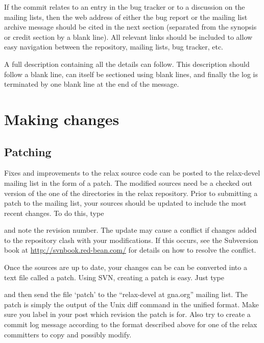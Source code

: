 If the commit relates to an entry in the bug tracker or to a discussion on the mailing lists, then the web address of either the bug report or the mailing list archive message should be cited in the next section (separated from the synopsis or credit section by a blank line).  All relevant links should be included to allow easy navigation between the repository, mailing lists, bug tracker, etc.

A full description containing all the details can follow.  This description should follow a blank line, can itself be sectioned using blank lines, and finally the log is terminated by one blank line at the end of the message.





\section{Making changes}


\subsection{Patching}

Fixes and improvements to the relax source code can be posted to the relax-devel mailing list in the form of a patch.  The modified sources need be a checked out version of the one of the directories in the relax repository.  Prior to submitting a patch to the mailing list, your sources should be updated to include the most recent changes.  To do this, type


and note the revision number.  The update may cause a conflict if changes added to the repository clash with your modifications.  If this occurs, see the Subversion book at \href{http://svnbook.red-bean.com/}{http://svnbook.red-bean.com/} for details on how to resolve the conflict.

Once the sources are up to date, your changes can be can be converted into a text file called a patch.  Using SVN, creating a patch is easy.  Just type


and then send the file `patch' to the ``relax-devel at gna.org'' mailing list.  The patch is simply the output of the Unix diff command in the unified format.  Make sure you label in your post which revision the patch is for.  Also try to create a commit log message according to the format described above for one of the relax committers to copy and possibly modify.


